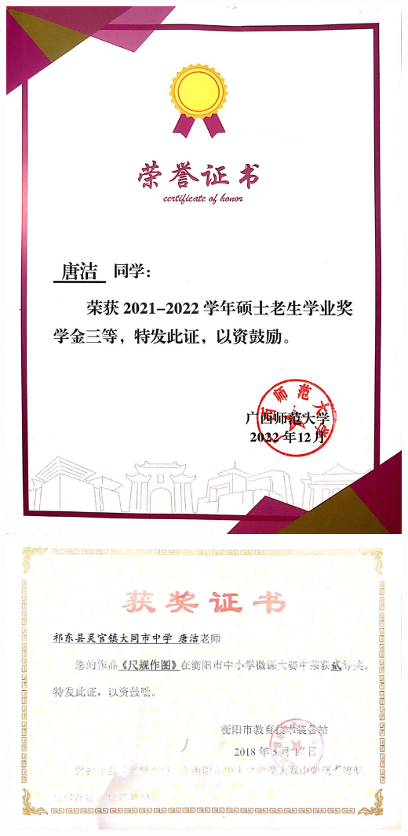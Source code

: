 \documentclass[UFT8]{ctexart}%
\begin{document}
\begin{center}
 \includegraphics[scale=0.15]{figs/2022-12.jpg }
 \includegraphics[scale=0.25]{figs/2018-05.jpg }

\end{center}
\end{document}
